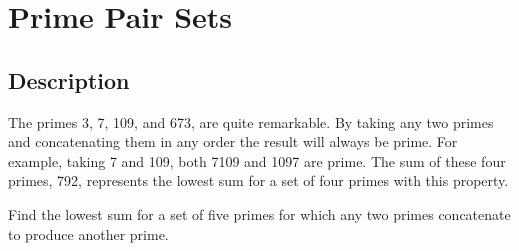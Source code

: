 \section{Prime Pair Sets}
\subsection{Description}
The primes 3, 7, 109, and 673, are quite remarkable. By taking any two primes and concatenating them in any order the
result will always be prime. For example, taking 7 and 109, both 7109 and 1097 are prime. The sum of these four primes,
792, represents the lowest sum for a set of four primes with this property.

Find the lowest sum for a set of five primes for which any two primes concatenate to produce another prime.
